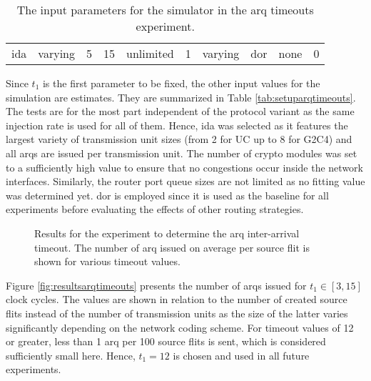 \begin{table}
    \centering
    \begin{tabulary}{\textwidth}{C|C|C|C|C|C|C|C|C|C}
        \pProtVar{} & \pNCMode{} & \pEncMods{} & \pAuthMods{} & \pRQSize{} & \pARQLimit{} & \pARQTimeout{} & \pRStrat{} & \pAttackerSet{} & \pAttackProb{} \\\hline
        \gls{ida}   & varying    & 5           & 15           & unlimited  & 1            & varying        & \gls{dor}  & none            & 0              \\
    \end{tabulary}
    \caption[Input parameters for ARQ timeouts experiment]{The input parameters for the simulator in the \gls{arq} timeouts experiment.}
    \label{tab:setuparqtimeouts}
\end{table}

Since $t_1$ is the first parameter to be fixed, the other input values for the simulation are estimates. They are summarized in Table
\vref{tab:setuparqtimeouts}. The tests are for the most part independent of the protocol variant as the same injection rate is used for all of them.
Hence, \gls{ida} was selected as it features the largest variety of transmission unit sizes (from 2 for UC up to 8 for G2C4) and all \glspl{arq} are
issued per transmission unit. The number of crypto modules was set to a sufficiently high value to ensure that no congestions occur inside the network
interfaces. Similarly, the router port queue sizes are not limited as no fitting value was determined yet. \Gls{dor} is employed since it is used as
the baseline for all experiments before evaluating the effects of other routing strategies.

\begin{figure}
    \centering
    
    \caption[Results for ARQ timeouts experiment]{Results for the experiment to determine the \gls{arq} inter-arrival timeout. The number of \gls{arq}
    issued on average per source flit is shown for various timeout values.}
    \label{fig:resultsarqtimeouts}
\end{figure}

Figure \vref{fig:resultsarqtimeouts} presents the number of \glspl{arq} issued for $t_1 \in [3, 15]$ clock cycles. The values are shown in relation to
the number of created source flits instead of the number of transmission units as the size of the latter varies significantly depending on the network
coding scheme. For timeout values of 12 or greater, less than 1 \gls{arq} per 100 source flits is sent, which is considered sufficiently small here.
Hence, $t_1 = 12$ is chosen and used in all future experiments.

